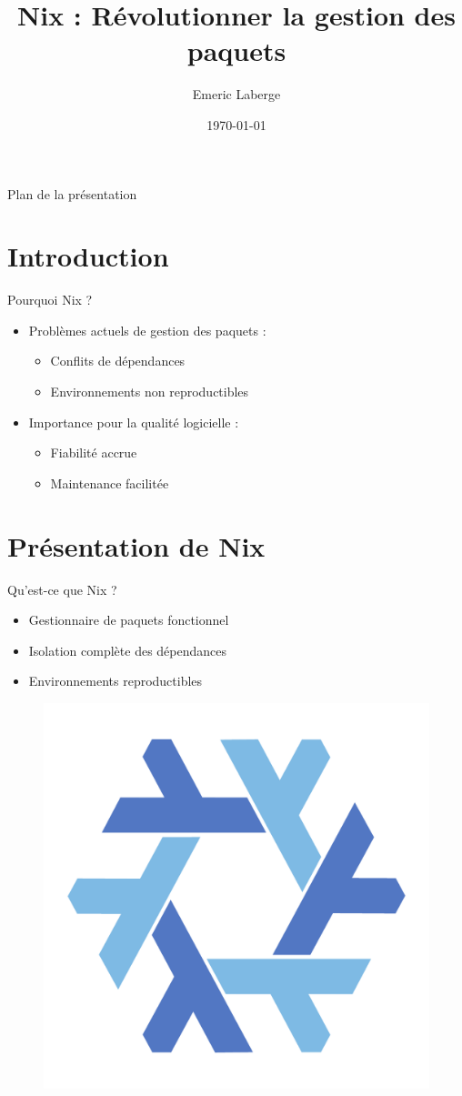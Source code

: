 \documentclass{beamer}
\title{Nix : Révolutionner la gestion des paquets}
\author{Emeric Laberge}
\date{\today}
\begin{document}
\maketitle

\begin{frame}{Plan de la présentation}
	\tableofcontents
\end{frame}

\section{Introduction}

\begin{frame}{Pourquoi Nix ?}
	\begin{itemize}
		\item Problèmes actuels de gestion des paquets :
		      \begin{itemize}
			      \item Conflits de dépendances
			      \item Environnements non reproductibles
		      \end{itemize}
		\item Importance pour la qualité logicielle :
		      \begin{itemize}
			      \item Fiabilité accrue
			      \item Maintenance facilitée
		      \end{itemize}
	\end{itemize}
\end{frame}

\section{Présentation de Nix}

\begin{frame}{Qu'est-ce que Nix ?}
	\begin{itemize}
		\item Gestionnaire de paquets fonctionnel
		\item Isolation complète des dépendances
		\item Environnements reproductibles
	\end{itemize}
	\begin{figure}
		\centering
		\includegraphics[width=0.3\linewidth]{nix-logo.pdf}
	\end{figure}
\end{frame}
\end{document}
